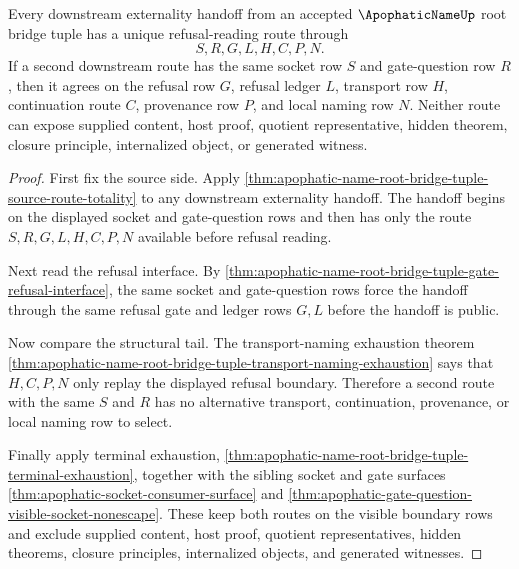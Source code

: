 \begin{theorem}
\label{thm:apophatic-name-root-bridge-tuple-downstream-refusal-uniqueness}
Every downstream externality handoff from an accepted $\ApophaticNameUp$ root bridge tuple has a unique refusal-reading route through
$$
S,R,G,L,H,C,P,N.
$$
If a second downstream route has the same socket row $S$ and gate-question row $R$, then it agrees on the refusal row $G$, refusal ledger $L$, transport row $H$, continuation route $C$, provenance row $P$, and local naming row $N$. Neither route can expose supplied content, host proof, quotient representative, hidden theorem, closure principle, internalized object, or generated witness.
\end{theorem}
\begin{proof}
First fix the source side. Apply \autoref{thm:apophatic-name-root-bridge-tuple-source-route-totality} to any downstream externality handoff. The handoff begins on the displayed socket and gate-question rows and then has only the route $S,R,G,L,H,C,P,N$ available before refusal reading.

Next read the refusal interface. By \autoref{thm:apophatic-name-root-bridge-tuple-gate-refusal-interface}, the same socket and gate-question rows force the handoff through the same refusal gate and ledger rows $G,L$ before the handoff is public.

Now compare the structural tail. The transport-naming exhaustion theorem \autoref{thm:apophatic-name-root-bridge-tuple-transport-naming-exhaustion} says that $H,C,P,N$ only replay the displayed refusal boundary. Therefore a second route with the same $S$ and $R$ has no alternative transport, continuation, provenance, or local naming row to select.

Finally apply terminal exhaustion, \autoref{thm:apophatic-name-root-bridge-tuple-terminal-exhaustion}, together with the sibling socket and gate surfaces \autoref{thm:apophatic-socket-consumer-surface} and \autoref{thm:apophatic-gate-question-visible-socket-nonescape}. These keep both routes on the visible boundary rows and exclude supplied content, host proof, quotient representatives, hidden theorems, closure principles, internalized objects, and generated witnesses.
\end{proof}

